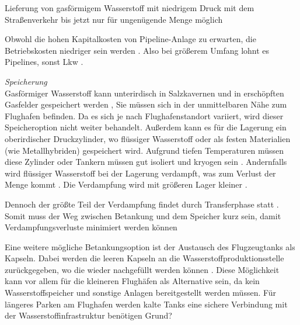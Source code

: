 Lieferung von gasförmigem Wasserstoff mit niedrigem Druck mit dem Straßenverkehr bis jetzt nur für ungenügende Menge möglich \cite{undertaking2022strategic}

Obwohl die hohen Kapitalkosten von Pipeline-Anlage zu erwarten, die Betriebskosten niedriger sein werden \cite{mulder2019outlook}. Also bei größerem Umfang lohnt es Pipelines, sonst Lkw \cite{mulder2019outlook}.

\textit{Speicherung}\\
Gasförmiger Wasserstoff kann unterirdisch in Salzkavernen und in erschöpften Gasfelder gespeichert werden \cite{undertaking2022strategic}, 
Sie müssen sich in der unmittelbaren Nähe zum Flughafen befinden. Da es sich je nach Flughafenstandort variiert, wird dieser Speicheroption nicht weiter behandelt.
Außerdem kann es für die Lagerung ein oberirdischer Druckzylinder, wo flüssiger Wasserstoff oder als festen Materialien (wie Metallhybriden) gespeichert wird.
Aufgrund tiefen Temperaturen müssen diese Zylinder oder Tankern müssen gut isoliert und kryogen sein \cite{undertaking2022strategic}.
Andernfalls wird flüssiger Wasserstoff bei der Lagerung verdampft, was zum Verlust der Menge kommt \cite{undertaking2022strategic}. 
Die Verdampfung wird mit größeren Lager kleiner \cite{colpan2022fuel}.

Dennoch der größte Teil der Verdampfung findet durch Transferphase statt \cite{undertaking2022strategic}.
Somit muss der Weg zwischen Betankung und dem Speicher kurz sein, damit Verdampfungsverluste minimiert werden können \cite{colpan2022fuel}


Eine weitere mögliche Betankungsoption ist der Austausch des Flugzeugtanks als Kapseln. Dabei werden die leeren Kapseln an die 
Wasserstoffproduktionsstelle zurückgegeben, wo die wieder nachgefüllt werden können \cite{colpan2022fuel}. 
Diese Möglichkeit kann vor allem für die kleineren Flughäfen als Alternative sein, da kein Wasserstoffspeicher und 
sonstige Anlagen bereitgestellt werden müssen.
Für längeres Parken am Flughafen werden kalte Tanks eine sichere Verbindung mit der Wasserstoffinfrastruktur benötigen \cite{colpan2022fuel} %
Grund?


%
%

